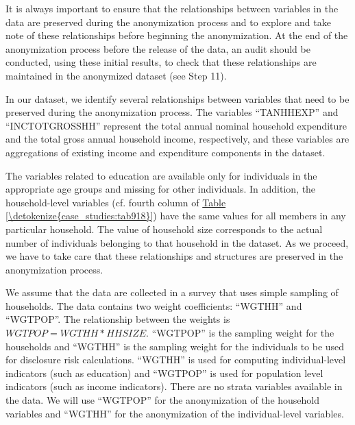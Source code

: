 \documentclass[letterpaper,10pt,english]{sphinxmanual}
\begin{document}
It is always important to ensure that the relationships between
variables in the data are preserved during the anonymization process and
to explore and take note of these relationships before beginning the
anonymization. At the end of the anonymization process before the
release of the data, an audit should be conducted, using these initial
results, to check that these relationships are maintained in the
anonymized dataset (see Step 11).

In our dataset, we identify several relationships between variables that
need to be preserved during the anonymization process. The variables
“TANHHEXP” and “INCTOTGROSSHH” represent the total annual nominal
household expenditure and the total gross annual household income,
respectively, and these variables are aggregations of existing income
and expenditure components in the dataset.

The variables related to education are available only for individuals in
the appropriate age groups and missing for other individuals. In
addition, the household-level variables (cf. fourth column of \hyperref[\detokenize{case_studies:tab918}]{Table \ref{\detokenize{case_studies:tab918}}})
have the same values for all members in any particular household.
The value of household size corresponds to the actual number of
individuals belonging to that household in the dataset. As we proceed,
we have to take care that these relationships and structures are
preserved in the anonymization process.

We assume that the data are collected in a survey that uses simple
sampling of households. The data contains two weight coefficients:
“WGTHH” and “WGTPOP”. The relationship between the weights is
\(WGTPOP = WGTHH * HHSIZE\). “WGTPOP” is the sampling weight
for the households and “WGTHH” is the sampling weight for the
individuals to be used for disclosure risk calculations. “WGTHH” is used
for computing individual-level indicators (such as education) and
“WGTPOP” is used for population level indicators (such as income
indicators). There are no strata variables available in the data. We
will use “WGTPOP” for the anonymization of the household variables and
“WGTHH” for the anonymization of the individual-level variables.
\end{document}
